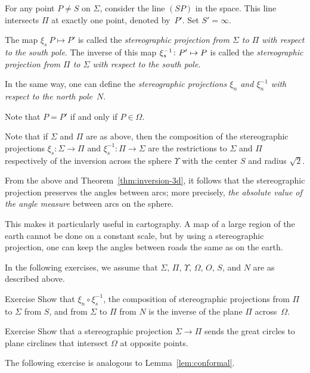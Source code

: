 For any point $P\ne S$ on $\Sigma$,
consider the line $(SP)$ in the space. 
This line intersects $\Pi$ at exactly one point, denoted by~$P'$. 
Set $S'=\infty$.


The map $\xi_s\: P\mapsto P'$ is called the \emph{stereographic projection from $\Sigma$ to $\Pi$ with respect to the south pole}.
The inverse of this map $\xi^{-1}_s\colon P'\mapsto P$ is called the {}\emph{stereographic projection from $\Pi$ to $\Sigma$ with respect to the south pole}.

In the same way, one can define the
{}\emph{stereographic projections $\xi_n$ and $\xi^{-1}_n$ with respect to the north pole}~$N$.

Note that $P=P'$ if and only if $P\in\Omega$.


Note that if $\Sigma$ and $\Pi$ are as above,
then the composition of the stereographic projections 
$\xi_s: \Sigma\to\Pi$ and  $\xi^{-1}_s: \Pi\to\Sigma$
are the restrictions to $\Sigma$ and $\Pi$ respectively of the inversion across the sphere $\Upsilon$ with the center $S$ and radius $\sqrt{2}$.


From the above and Theorem~\ref{thm:inversion-3d},
it follows that the stereographic projection preserves 
the angles between arcs;
more precisely, \textit{the absolute value of the angle measure} between arcs on the sphere.

This makes it particularly useful in cartography.
A map of a large region of the earth cannot be done on a constant scale,
but by using a stereographic projection, one can keep the angles between roads the same as on the earth.

In the following exercises,
we assume that $\Sigma$, $\Pi$, $\Upsilon$, $\Omega$, $O$, $S$, and $N$ are as described above.
  
\begin{thm}{Exercise}\label{ex:two-stereographics}
Show that $\xi_n \circ \xi^{-1}_s$, the composition of stereographic projections 
from $\Pi$ to $\Sigma$ from  $S$, and
from $\Sigma$ to $\Pi$ from  $N$ is 
the inverse of the plane $\Pi$ across~$\Omega$.
\end{thm}

\begin{thm}{Exercise}\label{ex:great-circ}
Show that  a stereographic projection $\Sigma\to\Pi$
sends the great circles to plane circlines that intersect $\Omega$ at opposite points.
\end{thm}

The following exercise is analogous to Lemma~\ref{lem:conformal}.

